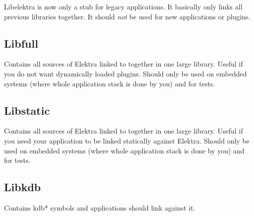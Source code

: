 Libelektra is now only a stub for legacy applications. It basically only links all previous libraries together. It should {\itshape not} be used for new applications or plugins.\hypertarget{md_src_libs_elektra_README_autotoc_md2}{}\subsection{Libfull}\label{md_src_libs_elektra_README_autotoc_md2}

\begin{DoxyCode}{0}
\end{DoxyCode}


Contains all sources of Elektra linked to together in one large library. Useful if you do not want dynamically loaded plugins. Should only be used on embedded systems (where whole application stack is done by you) and for tests.\hypertarget{md_src_libs_elektra_README_autotoc_md3}{}\subsection{Libstatic}\label{md_src_libs_elektra_README_autotoc_md3}

\begin{DoxyCode}{0}
\end{DoxyCode}


Contains all sources of Elektra linked to together in one large library. Useful if you need your application to be linked statically against Elektra. Should only be used on embedded systems (where whole application stack is done by you) and for tests.\hypertarget{md_src_libs_elektra_README_autotoc_md4}{}\subsection{Libkdb}\label{md_src_libs_elektra_README_autotoc_md4}

\begin{DoxyCode}{0}
\end{DoxyCode}


Contains {\ttfamily kdb$\ast$} symbols and applications should link against it. 
